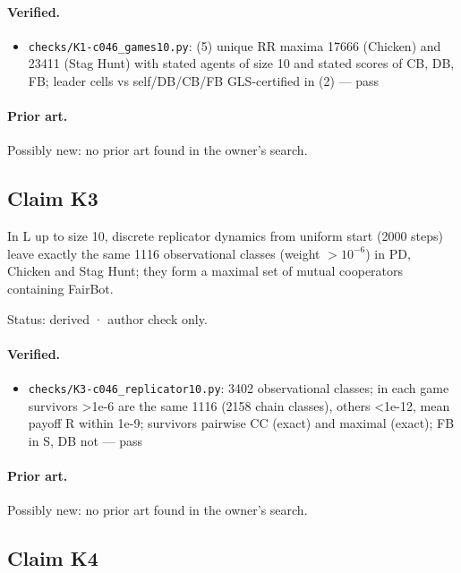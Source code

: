 \documentclass{article}
\begin{document}
\paragraph{Verified.}
\begin{itemize}
\item \texttt{checks/K1-c046\_games10.py}: (5) unique RR maxima 17666 (Chicken) and 23411 (Stag Hunt) with stated agents of size 10 and stated scores of CB, DB, FB; leader cells vs self/DB/CB/FB GLS-certified in (2) --- pass
\end{itemize}

\paragraph{Prior art.} Possibly new: no prior art found in the owner's search.

\subsection*{Claim K3}

In L up to size 10, discrete replicator dynamics from uniform start (2000 steps) leave exactly the same 1116 observational classes (weight $>10^{-6}$) in PD, Chicken and Stag Hunt; they form a maximal set of mutual cooperators containing FairBot.

Status: derived · author check only.

\paragraph{Verified.}
\begin{itemize}
\item \texttt{checks/K3-c046\_replicator10.py}: 3402 observational classes; in each game survivors \textgreater{}1e-6 are the same 1116 (2158 chain classes), others \textless{}1e-12, mean payoff R within 1e-9; survivors pairwise CC (exact) and maximal (exact); FB in S, DB not --- pass
\end{itemize}

\paragraph{Prior art.} Possibly new: no prior art found in the owner's search.

\subsection*{Claim K4}
\end{document}
